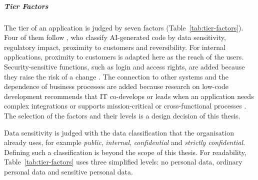 \documentclass[10pt,a4paper]{article}
\begin{document}
\subparagraph{Tier Factors}

The tier of an application is judged by seven factors
(Table~\ref{tab:tier-factors}). Four of them follow \textcite{kang2026},
who classify AI-generated code by data sensitivity, regulatory impact,
proximity to customers and reversibility. For internal applications,
proximity to customers is adapted here as the reach of the users.
Security-sensitive functions, such as login and access rights, are added
because they raise the risk of a change \parencite{koch2026agentic}. The
connection to other systems and the dependence of business processes are
added because research on low-code development recommends that IT
co-develops or leads when an application needs complex integrations or
supports mission-critical or cross-functional processes
\parencite{viljoen2024}. The selection of the factors and their levels
is a design decision of this thesis.

Data sensitivity is judged with the data classification that the
organisation already uses, for example \emph{public}, \emph{internal},
\emph{confidential} and \emph{strictly confidential}. Defining such a
classification is beyond the scope of this thesis. For readability,
Table~\ref{tab:tier-factors} uses three simplified levels: no personal
data, ordinary personal data and sensitive personal data.
\end{document}
